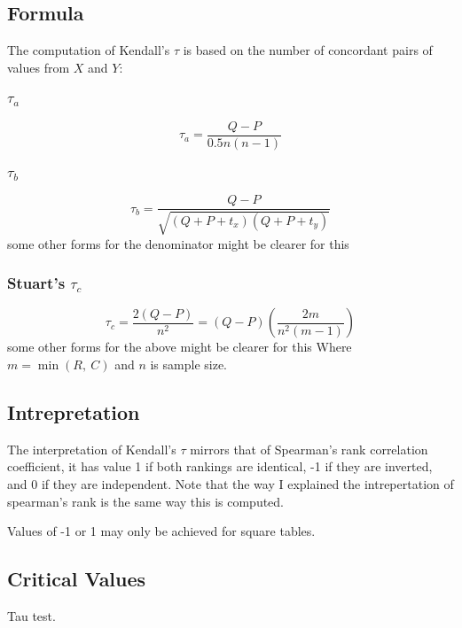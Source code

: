 \documentclass[11pt]{article}
\begin{document}
\subsection{Formula}
\label{section:kendalltau:formula}
The computation of Kendall's $\tau$ is based on the number of concordant pairs of values from $X$ and $Y$:

\subsubsection{$\tau_a$}
$$
\tau_a = \frac{Q-P}{0.5 n (n-1)}
$$

\subsubsection{$\tau_b$}
$$
\tau_b = \frac{Q-P}{ \sqrt{(Q + P + t_x)(Q + P + t_y)}  }
$$
{\color{red} some other forms for the denominator might be clearer for this}

\subsubsection{Stuart's $\tau_c$}
$$
\tau_c = \frac{2(Q-P)}{n^2} = (Q-P) \left( \frac{ 2m }{n^2(m-1)} \right)
$$
{\color{red} some other forms for the above might be clearer for this}
Where $m = \min(R,~C)$ and $n$ is sample size.


\subsection{Intrepretation}
The interpretation of Kendall's $\tau$ mirrors that of Spearman's rank correlation coefficient, it has value 1 if both rankings are identical, -1 if they are inverted, and 0 if they are independent.  Note that the way I explained the intrepertation of spearman's rank is the same way this is computed.

Values of -1 or 1 may only be achieved for square tables.


\subsection{Critical Values}
Tau test.
\end{document}
